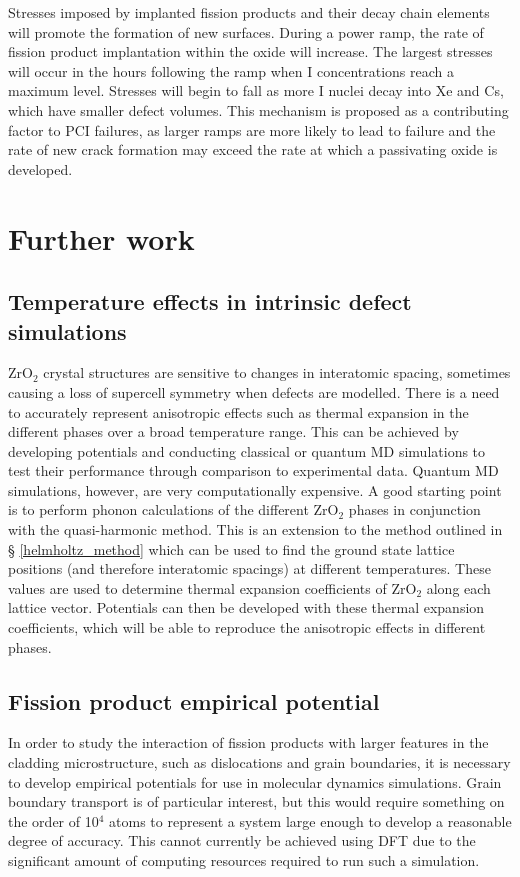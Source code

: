 Stresses imposed by implanted fission products and their decay chain elements will promote the formation of new surfaces. During a power ramp, the rate of fission product implantation within the oxide will increase. The largest stresses will occur in the hours following the ramp when I concentrations reach a maximum level. Stresses will begin to fall as more I nuclei decay into Xe and Cs, which have smaller defect volumes. This mechanism is proposed as a contributing factor to PCI failures, as larger ramps are more likely to lead to failure and the rate of new crack formation may exceed the rate at which a passivating oxide is developed.

\section{Further work}

\subsection{Temperature effects in intrinsic defect simulations}

ZrO$_{2}$ crystal structures are sensitive to changes in interatomic spacing, sometimes causing a loss of supercell symmetry when defects are modelled. There is a need to accurately represent anisotropic effects such as thermal expansion in the different phases over a broad temperature range. This can be achieved by developing potentials and conducting classical or quantum MD simulations to test their performance through comparison to experimental data. Quantum MD simulations, however, are very computationally expensive. A good starting point is to perform phonon calculations of the different ZrO$_{2}$ phases in conjunction with the quasi-harmonic method. This is an extension to the method outlined in § \ref{helmholtz_method} which can be used to find the ground state lattice positions (and therefore interatomic spacings) at different temperatures. These values are used to determine thermal expansion coefficients of ZrO$_{2}$ along each lattice vector. Potentials can then be developed with these thermal expansion coefficients, which will be able to reproduce the anisotropic effects in different phases.

\subsection{Fission product empirical potential}

In order to study the interaction of fission products with larger features in the cladding microstructure, such as dislocations and grain boundaries, it is necessary to develop empirical potentials for use in molecular dynamics simulations. Grain boundary transport is of particular interest, but this would require something on the order of 10$^{4}$ atoms to represent a system large enough to develop a reasonable degree of accuracy. This cannot currently be achieved using DFT due to the significant amount of computing resources required to run such a simulation. 

